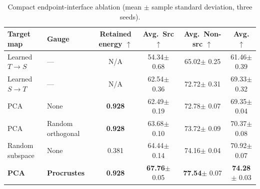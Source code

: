 \begin{table}[!t]
    \centering
    \caption{Compact endpoint-interface ablation (mean $\pm$ sample standard
    deviation, three seeds).}
    \label{tab:interface-families}
    \small
    \newcommand{\abcell}[2]{#1{\tiny $\pm$ #2}}
    \setlength{\tabcolsep}{5pt}
    \begin{tabular}{@{}llcccc@{}}
        \toprule
        Target map & Gauge & Retained energy $\uparrow$
        & Avg.~Src $\uparrow$ & Avg.~Non-src $\uparrow$ & Avg. $\uparrow$ \\
        \midrule
        Learned $T\!\to\!S$ & --- & N/A
        & \abcell{54.34}{0.68} & \abcell{65.02}{0.25} & \abcell{61.46}{0.39} \\
        Learned $S\!\to\!T$ & --- & N/A
        & \abcell{62.54}{0.36} & \abcell{72.72}{0.31} & \abcell{69.33}{0.32} \\
        \midrule
        PCA & None & \textbf{0.928}
        & \abcell{62.49}{0.19} & \abcell{72.78}{0.07} & \abcell{69.35}{0.04} \\
        PCA & Random orthogonal & \textbf{0.928}
        & \abcell{63.68}{0.10} & \abcell{73.72}{0.09} & \abcell{70.37}{0.08} \\
        Random subspace & None & 0.381
        & \abcell{64.44}{0.14} & \abcell{74.16}{0.04} & \abcell{70.92}{0.07} \\
        \textbf{PCA} & \textbf{Procrustes}
        & \textbf{0.928} & \abcell{\textbf{67.76}}{0.05}
        & \abcell{\textbf{77.54}}{0.07} & \abcell{\textbf{74.28}}{0.03} \\
        \bottomrule
    \end{tabular}
\end{table}
